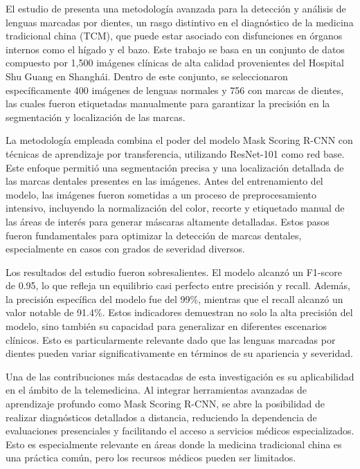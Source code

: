 El estudio de \cite{Kong2020} presenta una metodología avanzada para la detección y análisis de lenguas marcadas por dientes, un rasgo distintivo en el diagnóstico de la medicina tradicional china (TCM), que puede estar asociado con disfunciones en órganos internos como el hígado y el bazo. Este trabajo se basa en un conjunto de datos compuesto por 1,500 imágenes clínicas de alta calidad provenientes del Hospital Shu Guang en Shanghái. Dentro de este conjunto, se seleccionaron específicamente 400 imágenes de lenguas normales y 756 con marcas de dientes, las cuales fueron etiquetadas manualmente para garantizar la precisión en la segmentación y localización de las marcas.

La metodología empleada combina el poder del modelo Mask Scoring R-CNN con técnicas de aprendizaje por transferencia, utilizando ResNet-101 como red base. Este enfoque permitió una segmentación precisa y una localización detallada de las marcas dentales presentes en las imágenes. Antes del entrenamiento del modelo, las imágenes fueron sometidas a un proceso de preprocesamiento intensivo, incluyendo la normalización del color, recorte y etiquetado manual de las áreas de interés para generar máscaras altamente detalladas. Estos pasos fueron fundamentales para optimizar la detección de marcas dentales, especialmente en casos con grados de severidad diversos.

Los resultados del estudio fueron sobresalientes. El modelo alcanzó un F1-score de 0.95, lo que refleja un equilibrio casi perfecto entre precisión y recall. Además, la precisión específica del modelo fue del 99\%, mientras que el recall alcanzó un valor notable de 91.4\%. Estos indicadores demuestran no solo la alta precisión del modelo, sino también su capacidad para generalizar en diferentes escenarios clínicos. Esto es particularmente relevante dado que las lenguas marcadas por dientes pueden variar significativamente en términos de su apariencia y severidad.

Una de las contribuciones más destacadas de esta investigación es su aplicabilidad en el ámbito de la telemedicina. Al integrar herramientas avanzadas de aprendizaje profundo como Mask Scoring R-CNN, se abre la posibilidad de realizar diagnósticos detallados a distancia, reduciendo la dependencia de evaluaciones presenciales y facilitando el acceso a servicios médicos especializados. Esto es especialmente relevante en áreas donde la medicina tradicional china es una práctica común, pero los recursos médicos pueden ser limitados.

